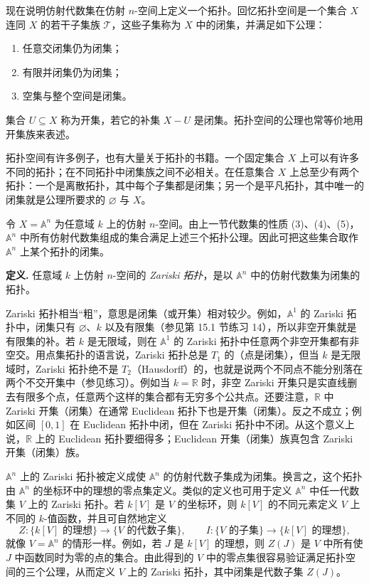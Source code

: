 现在说明仿射代数集在仿射 $n$-空间上定义一个拓扑。回忆拓扑空间是一个集合 $X$ 连同 $X$ 的若干子集族 $\mathcal T$，这些子集称为 $X$ 中的闭集，并满足如下公理：
\begin{enumerate}[label=(\roman*)]
	\item 任意交闭集仍为闭集；
	\item 有限并闭集仍为闭集；
	\item 空集与整个空间是闭集。
\end{enumerate}
集合 $U\subseteq X$ 称为开集，若它的补集 $X-U$ 是闭集。拓扑空间的公理也常等价地用开集族来表述。

拓扑空间有许多例子，也有大量关于拓扑的书籍。一个固定集合 $X$ 上可以有许多不同的拓扑；在不同拓扑中闭集族之间不必相关。在任意集合 $X$ 上总至少有两个拓扑：一个是离散拓扑，其中每个子集都是闭集；另一个是平凡拓扑，其中唯一的闭集就是公理所要求的 $\varnothing$ 与 $X$。

令 $X=\mathbb A^n$ 为任意域 $k$ 上的仿射 $n$-空间。由上一节代数集的性质 (3)、(4)、(5)，$\mathbb A^n$ 中所有仿射代数集组成的集合满足上述三个拓扑公理。因此可把这些集合取作 $\mathbb A^n$ 上某个拓扑的闭集。

\noindent\textbf{定义.} 任意域 $k$ 上仿射 $n$-空间的 \emph{Zariski 拓扑}，是以 $\mathbb A^n$ 中的仿射代数集为闭集的拓扑。

Zariski 拓扑相当“粗”，意思是闭集（或开集）相对较少。例如，$\mathbb A^1$ 的 Zariski 拓扑中，闭集只有 $\varnothing$、$k$ 以及有限集（参见第 15.1 节练习 14），所以非空开集就是有限集的补。若 $k$ 是无限域，则在 $\mathbb A^1$ 的 Zariski 拓扑中任意两个非空开集都有非空交。用点集拓扑的语言说，Zariski 拓扑总是 $T_1$ 的（点是闭集），但当 $k$ 是无限域时，Zariski 拓扑绝不是 $T_2$（Hausdorff）的，也就是说两个不同点不能分别落在两个不交开集中（参见练习）。例如当 $k=\mathbb R$ 时，非空 Zariski 开集只是实直线删去有限多个点，任意两个这样的集合都有无穷多个公共点。还要注意，$\mathbb R$ 中 Zariski 开集（闭集）在通常 Euclidean 拓扑下也是开集（闭集）。反之不成立；例如区间 $[0,1]$ 在 Euclidean 拓扑中闭，但在 Zariski 拓扑中不闭。从这个意义上说，$\mathbb R$ 上的 Euclidean 拓扑要细得多；Euclidean 开集（闭集）族真包含 Zariski 开集（闭集）族。

$\mathbb A^n$ 上的 Zariski 拓扑被定义成使 $\mathbb A^n$ 的仿射代数子集成为闭集。换言之，这个拓扑由 $\mathbb A^n$ 的坐标环中的理想的零点集定义。类似的定义也可用于定义 $\mathbb A^n$ 中任一代数集 $V$ 上的 Zariski 拓扑。若 $k[V]$ 是 $V$ 的坐标环，则 $k[V]$ 的不同元素定义 $V$ 上不同的 $k$-值函数，并且可自然地定义
\[
Z:\{k[V]\text{ 的理想}\}\longrightarrow \{V\text{ 的代数子集}\},
\qquad
I:\{V\text{ 的子集}\}\longrightarrow \{k[V]\text{ 的理想}\},
\]
就像 $V=\mathbb A^n$ 的情形一样。例如，若 $J$ 是 $k[V]$ 的理想，则 $Z(J)$ 是 $V$ 中所有使 $J$ 中函数同时为零的点的集合。由此得到的 $V$ 中的零点集很容易验证满足拓扑空间的三个公理，从而定义 $V$ 上的 Zariski 拓扑，其中闭集是代数子集 $Z(J)$。


